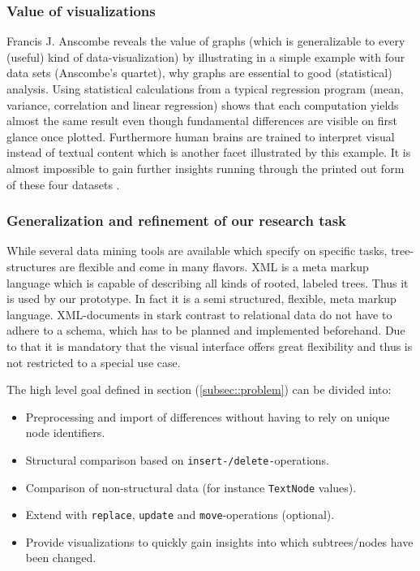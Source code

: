 \subsubsection{Value of visualizations}
Francis J. Anscombe reveals the value of graphs (which is generalizable to every (useful) kind of data-visualization) by illustrating in a simple example with four data sets (Anscombe's quartet), why graphs are essential to good (statistical) analysis. Using statistical calculations from a typical regression program (mean, variance, correlation and linear regression) shows that each computation yields almost the same result even though fundamental differences are visible on first glance once plotted. Furthermore human brains are trained to interpret visual instead of textual content which is another facet illustrated by this example. It is almost impossible to gain further insights running through the printed out form of these four datasets \cite{ANSCOMBE}. 

\subsubsection{Generalization and refinement of our research task}
While several data mining tools are available which specify on specific tasks, tree-structures are flexible and come in many flavors. XML is a meta markup language which is capable of describing all kinds of rooted, labeled trees. Thus it is used by our prototype. In fact it is a semi structured, flexible, meta markup language. XML-documents in stark contrast to relational data do not have to adhere to a schema, which has to be planned and implemented beforehand. Due to that it is mandatory that the visual interface offers great flexibility and thus is not restricted to a special use case.

The high level goal defined in section (\ref{subsec::problem}) can be divided into:

\begin{itemize}
\item Preprocessing and import of differences without having to rely on unique node identifiers.
\item Structural comparison based on \texttt{insert-/delete-}operations.
\item Comparison of non-structural data (for instance \texttt{TextNode} values).
\item Extend with \texttt{replace}, \texttt{update} and \texttt{move}-operations (optional).
\item Provide visualizations to quickly gain insights into which subtrees/nodes have been changed.
\end{itemize}

